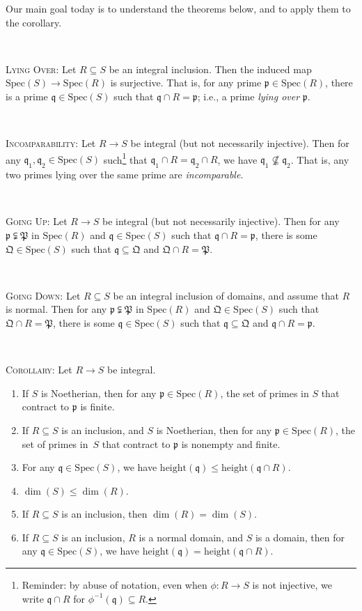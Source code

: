 \documentclass[12pt]{amsart}
\newcommand{\p}{\mathfrak{p}}
\newcommand{\q}{\mathfrak{q}}
\newcommand{\Spec}{\mathrm{Spec}}
\newcommand{\0}{$\phantom{.}$}
\newcommand{\1}{\mathbbm{1}}
\begin{document}
\noindent Our main goal today is to understand the theorems below, and to apply them to the corollary.

\

\noindent \textsc{Lying Over:} Let $R\subseteq S$ be an integral inclusion. Then the induced map ${\Spec(S)\to \Spec(R)}$ is surjective. That is, for any prime $\p\in \Spec(R)$, there is a prime $\q\in \Spec(S)$ such that $\q \cap R =\p$; i.e., a prime \emph{lying over} $\p$.

\

\noindent \textsc{Incomparability:} Let $R\to S$ be integral (but not necessarily injective). Then for any ${\q_1,\q_2\in \Spec(S)}$ such\footnote{Reminder: by abuse of notation, even when $\phi:R\to S$ is not injective, we write $\q \cap R$ for $\phi^{-1}(\q) \subseteq R$.} that $\q_1 \cap R = \q_2 \cap R$, we have $\q_1 \not\nsubseteq \q_2$. That is, any two primes lying over the same prime are \emph{incomparable}.


\

\noindent \textsc{Going Up:} Let $R\to S$ be integral (but not necessarily injective). Then for any $\p \subsetneqq \mathfrak{P}$ in $\Spec(R)$ and $\q\in \Spec(S)$ such that $\q \cap R = \p$, there is some $\mathfrak{Q}\in \Spec(S)$ such that $\q \subseteq \mathfrak{Q}$ and $\mathfrak{Q} \cap R = \mathfrak{P}$. 

\

\noindent \textsc{Going Down:} Let $R\subseteq S$ be an integral inclusion of domains, and assume that $R$ is normal. Then for any $\p \subsetneqq \mathfrak{P}$  in $\Spec(R)$ and $\mathfrak{Q}\in \Spec(S)$ such that $\mathfrak{Q} \cap R = \mathfrak{P}$, there is some $\q\in \Spec(S)$ such that $\q \subseteq \mathfrak{Q}$ and $\q \cap R = \p$. 

\

\noindent \textsc{Corollary:} Let $R\to S$ be integral.
\begin{enumerate}
\item If $S$ is Noetherian, then for any $\p\in \Spec(R)$, the set of primes in $S$ that contract to $\p$ is finite.
\item If $R\subseteq S$ is an inclusion, and $S$ is Noetherian, then for any $\p\in \Spec(R)$, the set of primes in~$S$ that contract to $\p$ is nonempty and finite.
\item For any $\q\in \Spec(S)$, we have $\mathrm{height}(\q) \leq \mathrm{height}(\q \cap R)$.
\item $\dim(S) \leq \dim(R)$.
\item If $R\subseteq S$ is an inclusion, then $\dim(R)=\dim(S)$.
\item If $R\subseteq S$ is an inclusion, $R$ is a normal domain, and $S$ is a domain, then for any ${\q\in \Spec(S)}$, we have ${\mathrm{height}(\q) = \mathrm{height}(\q \cap R)}$.
\end{enumerate}
\end{document}
